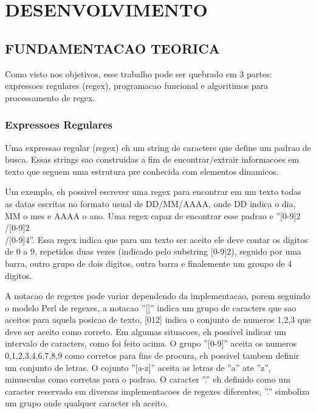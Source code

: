 \section{DESENVOLVIMENTO}

\subsection{FUNDAMENTACAO TEORICA}
Como visto nos objetivos, esse trabalho pode ser quebrado em 3 partes: expressoes regulares (regex), programacao funcional e algoritimos para processamento de regex.
\subsubsection{Expressoes Regulares}


Uma expressao regular (regex) eh um string de caracters que define um padrao de busca.
Essas strings sao construidas a fim de encontrar/extrair informacoes em texto que seguem uma estrutura pre conhecida com elementos dinamicos.

Um exemplo, eh possivel escrever uma regex para encontrar em um texto todas as datas escritas no formato usual de DD/MM/AAAA, onde DD indica o dia, MM o mes e AAAA o ano.
Uma regex capaz de encontrar esse padrao e ''[0-9]{2}\\/[0-9]{2}\\/[0-9]{4}''.
Essa regex indica que para um texto ser aceito ele deve contar os digitos de 0 a 9, repetidos duas vezes (indicado pelo substring [0-9]{2}), seguido por uma barra, outro grupo de dois digitos, outra barra e finalemente um groupo de 4 digitos.

A notacao de regexes pode variar dependendo da implementacao, porem seguindo o modelo Perl de regexes, a notacao ''[]'' indica um grupo de caracters que sao aceitos para aquela posicao de texto, [012] indica o conjunto de numeros {1,2,3} que deve ser aceito como correto.
Em algumas situacoes, eh possivel indicar um intervalo de caracters, como foi feito acima.
O grupo ''[0-9]'' aceita os numeros {0,1,2,3,4,6,7,8,9} como corretos para fins de procura, eh possivel tambem definir um conjunto de letras.
O cojunto ''[a-z]'' aceita as letras de ''a'' ate ''z'', minusculas como corretas para o padrao.
O caracter ''.'' eh definido como um caracter reservado em diversas implementacoes de regexes diferentes, ''.'' simboliza um grupo onde qualquer caracter eh aceito.

